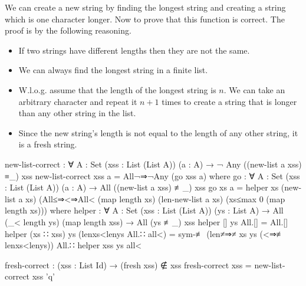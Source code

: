 We can create a new string by finding the longest string and creating a string which is one
character longer. Now to prove that this function is correct. The proof is by the following
reasoning.

\begin{itemize}
  \item If two strings have different lengths then they are not the same.
  \item We can always find the longest string in a finite list.
  \item W.l.o.g. assume that the length of the longest string is $n$. We can take an arbitrary
  character and repeat it $n + 1$ times to create a string that is longer than any other string in
  the list.
  \item Since the new string's length is not equal to the length of any other string, it is a fresh
  string.
\end{itemize}

\begin{code}
  new-list-correct :
    ∀ {A : Set} (xss : List (List A)) (a : A)
    → ¬ Any ((new-list a xss) ≡_) xss
  new-list-correct xss a = All¬⇒¬Any (go xss a)
    where
      go : ∀ {A : Set} (xss : List (List A)) (a : A)
        → All ((new-list a xss) ≢_) xss
      go xs a =
        helper
          xs
          (new-list a xs)
          (All≤⇒<⇒All<
            (map length xs)
            (len-new-list a xs)
            (xs≤max 0 (map length xs)))
        where
          helper : ∀ {A : Set} (xss : List (List A)) (ys : List A)
            → All (_< length ys) (map length xss)
            → All (ys ≢_) xss
          helper [] ys All.[] = All.[]
          helper (xs ∷ xss) ys (lenxs<lenys All.∷ all<) =
            sym-≢ (len≠⇒≠ xs ys (<⇒≢ lenxs<lenys))
              All.∷ helper xss ys all<

  fresh-correct : (xss : List Id) → (fresh xss) ∉ xss
  fresh-correct xss = new-list-correct xss 'q'
\end{code}
